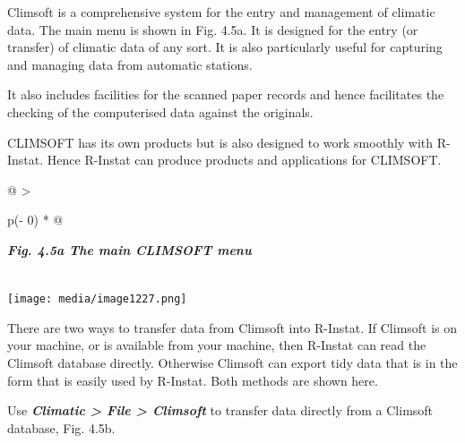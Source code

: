 \documentclass[
  letterpaper,
  DIV=11,
  numbers=noendperiod]{scrreprt}
\begin{document}
Climsoft is a comprehensive system for the entry and management of
climatic data. The main menu is shown in Fig. 4.5a. It is designed for
the entry (or transfer) of climatic data of any sort. It is also
particularly useful for capturing and managing data from automatic
stations.

It also includes facilities for the scanned paper records and hence
facilitates the checking of the computerised data against the originals.

CLIMSOFT has its own products but is also designed to work smoothly with
R-Instat. Hence R-Instat can produce products and applications for
CLIMSOFT.

\begin{longtable}[]{@{}
  >{\raggedright\arraybackslash}p{(\columnwidth - 0\tabcolsep) * }@{}}
\toprule\noalign{}
\begin{minipage}[b]{\linewidth}\raggedright
\textbf{\emph{Fig. 4.5a The main CLIMSOFT menu}}
\end{minipage} \\
\midrule\noalign{}
\endhead
\bottomrule\noalign{}
\endlastfoot
\texttt{[image: media/image1227.png]} \\
\end{longtable}

There are two ways to transfer data from Climsoft into R-Instat. If
Climsoft is on your machine, or is available from your machine, then
R-Instat can read the Climsoft database directly. Otherwise Climsoft can
export tidy data that is in the form that is easily used by R-Instat.
Both methods are shown here.

Use \textbf{\emph{Climatic \textgreater{} File \textgreater{} Climsoft}}
to transfer data directly from a Climsoft database, Fig. 4.5b.
\end{document}
